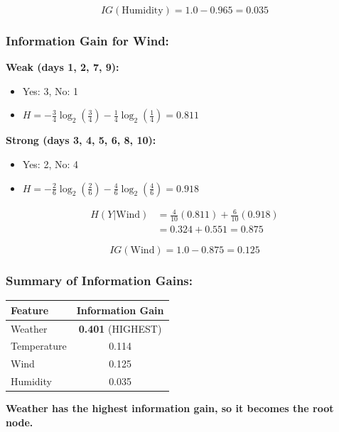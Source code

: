 \documentclass[12pt]{article}
\begin{document}
\begin{equation*}
\boxed{IG(\text{Humidity}) = 1.0 - 0.965 = 0.035}
\end{equation*}

\subsubsection*{Information Gain for Wind:}

\textbf{Weak (days 1, 2, 7, 9):}
\begin{itemize}
    \item Yes: 3, No: 1
    \item $H = -\frac{3}{4}\log_2\left(\frac{3}{4}\right) - \frac{1}{4}\log_2\left(\frac{1}{4}\right) = 0.811$
\end{itemize}

\textbf{Strong (days 3, 4, 5, 6, 8, 10):}
\begin{itemize}
    \item Yes: 2, No: 4
    \item $H = -\frac{2}{6}\log_2\left(\frac{2}{6}\right) - \frac{4}{6}\log_2\left(\frac{4}{6}\right) = 0.918$
\end{itemize}

\begin{align*}
H(Y|\text{Wind}) &= \frac{4}{10}(0.811) + \frac{6}{10}(0.918) \\
&= 0.324 + 0.551 = 0.875
\end{align*}

\begin{equation*}
\boxed{IG(\text{Wind}) = 1.0 - 0.875 = 0.125}
\end{equation*}

\subsubsection*{Summary of Information Gains:}
\begin{center}
\begin{tabular}{lc}
\toprule
\textbf{Feature} & \textbf{Information Gain} \\
\midrule
Weather & \textbf{0.401} (HIGHEST) \\
Temperature & 0.114 \\
Wind & 0.125 \\
Humidity & 0.035 \\
\bottomrule
\end{tabular}
\end{center}

\textbf{Weather has the highest information gain, so it becomes the root node.}
\end{document}
